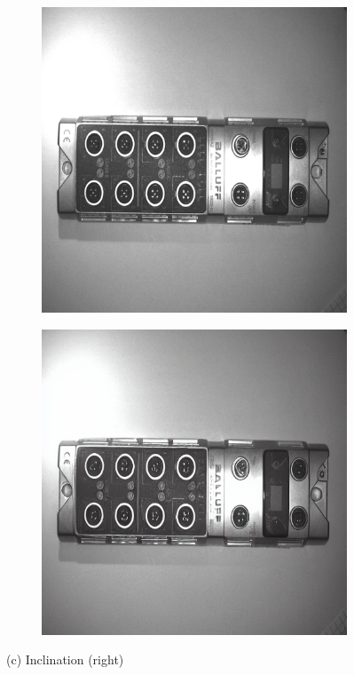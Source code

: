 \documentclass[12pt,DIV14,BCOR12mm,a4paper,footinclude=false,headinclude,parskip=half-,twoside,openright,cleardoublepage=empty,toc=index,bibliography=totoc,listof=totoc]{scrreprt}
\numberwithin{equation}{chapter}
\begin{document}
\begin{figure}
    \vspace{0.3cm} %

    \begin{subfigure}[t]{0.45\textwidth}
        \centering
        \includegraphics[width=\textwidth]{../media/diff_bni_right_real.png}
    \end{subfigure}%
    \hspace{0.02\textwidth}%
    \begin{subfigure}[t]{0.45\textwidth}
        \centering
        \includegraphics[width=\textwidth]{../media/diff_bni_right_fake.png}
    \end{subfigure}
    \caption*{(c) Inclination (right)}

\end{figure}
\end{document}

